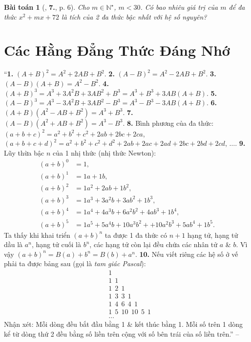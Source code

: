 \documentclass{article}
\numberwithin{equation}{section}
\newtheorem{baitoan}{Bài toán}
\begin{document}
\begin{baitoan}[\cite{Tuyen_Toan_8}, \textbf{7.}, p. 6]
	Cho $m\in\mathbb{N}^\star$, $m < 30$. Có bao nhiêu giá trị của $m$ để đa thức $x^2 + mx + 72$ là tích của 2 đa thức bậc nhất với hệ số nguyên?
\end{baitoan}


\section{Các Hằng Đẳng Thức Đáng Nhớ}
``\textbf{1.} $(A + B)^2 = A^2 + 2AB + B^2$. \textbf{2.} $(A - B)^2 = A^2 - 2AB + B^2$. \textbf{3.} $(A - B)(A + B) = A^2 - B^2$. \textbf{4.} $(A + B)^3 = A^3 + 3A^2B + 3AB^2 + B^3 = A^3 + B^3 + 3AB(A + B)$. \textbf{5.} $(A - B)^3 = A^3 - 3A^2B + 3AB^2 - B^3 = A^3 - B^3 - 3AB(A + B)$. \textbf{6.} $(A + B)(A^2 - AB + B^2) = A^3 + B^3$. \textbf{7.} $(A - B)(A^2 + AB + B^2) = A^3 - B^3$. \textbf{8.} Bình phương của đa thức: $(a + b + c)^2 = a^2 + b^2 + c^2 + 2ab + 2bc + 2ca$, $(a + b + c + d)^2 = a^2 + b^2 + c^2 + d^2 + 2ab + 2ac + 2ad + 2bc + 2bd + 2cd$, $\ldots$. \textbf{9.} Lũy thừa bậc $n$ của 1 nhị thức (nhị thức Newton):
\begin{align*}
	(a + b)^0 &= 1,\\
	(a + b)^1 &= 1a + 1b,\\
	(a + b)^2 &= 1a^2 + 2ab + 1b^2,\\
	(a + b)^3 &= 1a^3 + 3a^2b + 3ab^2 + 1b^3,\\
	(a + b)^4 &= 1a^4 + 4a^3b + 6a^2b^2 + 4ab^3 + 1b^4,\\
	(a + b)^5 &= 1a^5 + 5a^4b + 10a^3b^2 + + 10a^2b^3 + 5ab^4 + 1b^5.
\end{align*}
Ta thấy khi khai triển $(a + b)^n$ ta được 1 đa thức có $n + 1$ hạng tử, hạng tử dầu là $a^n$, hạng tử cuối là $b^n$, các hạng tử còn lại đều chứa các nhân tử $a$ \& $b$. Vì vậy $(a + b)^n = B(a) + b^n = B(b) + a^n$. \textbf{10.} Nếu viết riêng các hệ số ở vế phải ta được bảng sau (gọi là \textit{tam giác Pascal}):
\begin{align*}
	&1\\
	&1\ \ 1\\
	&1\ \ 2\ \ 1\\
	&1\ \ 3\ \ 3\ \ 1\\
	&1\ \ 4\ \ 6\ \ 4\ \ 1\\
	&1\ \ 5\ \ 10\ \ 10\ \ 5\ \ 1\\
	&\ldots
\end{align*}
Nhận xét: Mỗi dòng đều bắt đầu bằng 1 \& kết thúc bằng 1. Mỗi số trên 1 dòng kể từ dòng thứ 2 đều bằng số liền trên cộng với số bên trái của số liền trên.'' -- \cite[\S2, pp. 6--7]{Tuyen_Toan_8}
\end{document}

